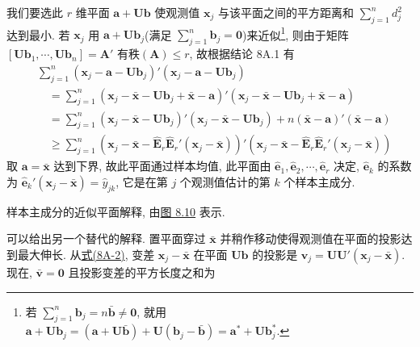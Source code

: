 我们要选此 $r$ 维平面 $\mathbf{a}+\mathbf{U}\mathbf{b}$ 使观测值 $\mathbf{x}_j$ 与该平面之间的平方距离和 $\sum_{j=1}^{n}d_j^2$ 达到最小. 若 $\mathbf{x}_j$ 用 $\mathbf{a}+\mathbf{U}\mathbf{b}_j$(满足 $\sum_{j=1}^{n}\mathbf{b}_j=\mathbf{0}$)来近似\footnote{若 $\sum_{j=1}^{n}\mathbf{b}_j=n\bar{\mathbf{b}}\neq\mathbf{0}$, 就用 $\mathbf{a}+\mathbf{U}\mathbf{b}_j=(\mathbf{a}+\mathbf{U}\bar{\mathbf{b}})+\mathbf{U}(\mathbf{b}_j-\bar{\mathbf{b}})=\mathbf{a}^*+\mathbf{U}\mathbf{b}_j^*$.}, 则由于矩阵 $[\mathbf{U}\mathbf{b}_1,\cdots,\mathbf{U}\mathbf{b}_n]=\mathbf{A}'$ 有秩$(\mathbf{A})\leqslant r$, 故根据结论 8A.1 有
\[
\begin{aligned}
&\sum_{j=1}^{n}(\mathbf{x}_j-\mathbf{a}-\mathbf{U}\mathbf{b}_j)'(\mathbf{x}_j-\mathbf{a}-\mathbf{U}\mathbf{b}_j)\\
&\quad=\sum_{j=1}^{n}(\mathbf{x}_j-\bar{\mathbf{x}}-\mathbf{U}\mathbf{b}_j+\bar{\mathbf{x}}-\mathbf{a})'(\mathbf{x}_j-\bar{\mathbf{x}}-\mathbf{U}\mathbf{b}_j+\bar{\mathbf{x}}-\mathbf{a})\\
&\quad=\sum_{j=1}^{n}(\mathbf{x}_j-\bar{\mathbf{x}}-\mathbf{U}\mathbf{b}_j)'(\mathbf{x}_j-\bar{\mathbf{x}}-\mathbf{U}\mathbf{b}_j)+n(\bar{\mathbf{x}}-\mathbf{a})'(\bar{\mathbf{x}}-\mathbf{a})\\
&\quad\geqslant\sum_{j=1}^{n}(\mathbf{x}_j-\bar{\mathbf{x}}-\hat{\mathbf{E}}_r\hat{\mathbf{E}}_r'(\mathbf{x}_j-\bar{\mathbf{x}}))'(\mathbf{x}_j-\bar{\mathbf{x}}-\hat{\mathbf{E}}_r\hat{\mathbf{E}}_r'(\mathbf{x}_j-\bar{\mathbf{x}}))
\end{aligned}
\]
取 $\mathbf{a}=\bar{\mathbf{x}}$ 达到下界, 故此平面通过样本均值, 此平面由 $\hat{\mathbf{e}}_1,\hat{\mathbf{e}}_2,\cdots,\hat{\mathbf{e}}_r$ 决定, $\hat{\mathbf{e}}_k$ 的系数为 $\hat{\mathbf{e}}_k'(\mathbf{x}_j-\bar{\mathbf{x}})=\hat{y}_{jk}$, 它是在第 $j$ 个观测值估计的第 $k$ 个样本主成分.

\begin{mvfigure}
\label{fig:8.10}
\end{mvfigure}

样本主成分的近似平面解释, 由\hyperref[fig:8.10]{图 8.10} 表示.

可以给出另一个替代的解释. 置平面穿过 $\bar{\mathbf{x}}$ 并稍作移动使得观测值在平面的投影达到最大伸长. 从\hyperref[eq:8A-2]{式(8A-2)}, 变差 $\mathbf{x}_j-\bar{\mathbf{x}}$ 在平面 $\mathbf{U}\mathbf{b}$ 的投影是 $\mathbf{v}_j=\mathbf{U}\mathbf{U}'(\mathbf{x}_j-\bar{\mathbf{x}})$. 现在, $\bar{\mathbf{v}}=\mathbf{0}$ 且投影变差的平方长度之和为
